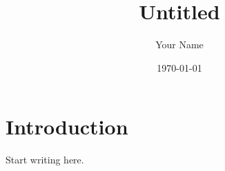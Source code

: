 \documentclass[11pt]{article}
\title{Untitled}
\author{Your Name}
\date{\today}
\begin{document}
\maketitle

\section{Introduction}
Start writing here.
\end{document}
